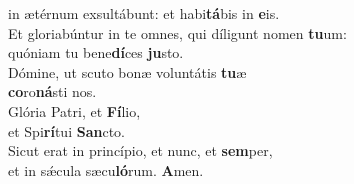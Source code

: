 \oddverse in ætérnum exsultábunt: et habi\textbf{tá}bis in \textbf{e}is.\\
\evenverse Et gloriabúntur in te omnes, qui díligunt nomen \textbf{tu}um:~\*\\
\evenverse quóniam tu bene\textbf{dí}ces \textbf{ju}sto.\\
\oddverse Dómine, ut scuto bonæ voluntátis \textbf{tu}æ~\*\\
\oddverse \textbf{co}ro\textbf{ná}sti nos.\\
\evenverse Glória Patri, et \textbf{Fí}lio,~\*\\
\evenverse et Spi\textbf{rí}tui \textbf{San}cto.\\
\oddverse Sicut erat in princípio, et nunc, et \textbf{sem}per,~\*\\
\oddverse et in sǽcula sæcu\textbf{ló}rum. \textbf{A}men.\\
